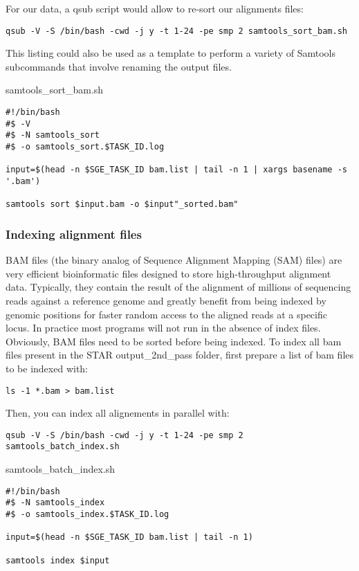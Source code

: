 For our data, a qsub script would allow to re-sort our alignments files:


\begin{verbatim}
qsub -V -S /bin/bash -cwd -j y -t 1-24 -pe smp 2 samtools_sort_bam.sh
\end{verbatim}

This listing could also be used as a template to perform a variety of Samtools subcommands that involve renaming the output files.

\noindent samtools\_sort\_bam.sh
\begin{verbatim}
#!/bin/bash
#$ -V
#$ -N samtools_sort
#$ -o samtools_sort.$TASK_ID.log

input=$(head -n $SGE_TASK_ID bam.list | tail -n 1 | xargs basename -s '.bam')

samtools sort $input.bam -o $input"_sorted.bam"

\end{verbatim}


\subsubsection{Indexing alignment files}

BAM files (the binary analog of Sequence Alignment Mapping (SAM) files) are very efficient bioinformatic files designed to store high-throughput alignment data. Typically, they contain the result of the alignment of millions of sequencing reads against a reference genome and greatly benefit from being indexed by genomic positions for faster random access to the aligned reads at a specific locus. In practice most programs will not run in the absence of index files. Obviously, BAM files need to be sorted before being indexed. To index all bam files present in the STAR output\_2nd\_pass folder, first prepare a list of bam files to be indexed with:

\begin{verbatim}
ls -1 *.bam > bam.list
\end{verbatim}

Then, you can index all alignements in parallel with:

\begin{verbatim}
qsub -V -S /bin/bash -cwd -j y -t 1-24 -pe smp 2 samtools_batch_index.sh
\end{verbatim}

\noindent samtools\_batch\_index.sh

\begin{verbatim}
#!/bin/bash
#$ -N samtools_index
#$ -o samtools_index.$TASK_ID.log

input=$(head -n $SGE_TASK_ID bam.list | tail -n 1)

samtools index $input
\end{verbatim}





